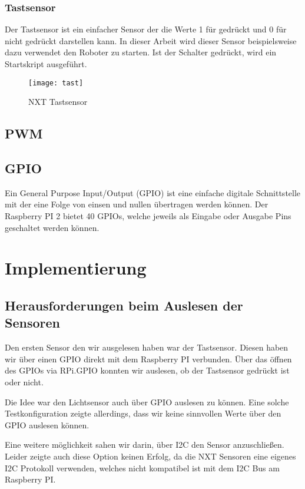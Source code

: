 \subsection{Tastsensor}

Der Tastsensor ist ein einfacher Sensor der die Werte 1 für gedrückt und 0 für nicht gedrückt darstellen kann. In dieser Arbeit wird dieser Sensor beispielsweise dazu verwendet den Roboter zu starten. Ist der Schalter gedrückt, wird ein Startskript ausgeführt.

\begin{figure}[h]
  \centering
  \texttt{[image: tast]}
  \caption{NXT Tastsensor}
  \label{Kap1:tast}
\end{figure}

\section{PWM}

\section{GPIO}
Ein General Purpose Input/Output (GPIO) ist eine einfache digitale Schnittstelle mit der eine Folge von einsen und nullen übertragen werden können.
Der Raspberry PI 2 bietet 40 GPIOs, welche jeweils als Eingabe oder Ausgabe Pins geschaltet werden können.

\chapter{Implementierung}

\section{Herausforderungen beim Auslesen der Sensoren}

Den ersten Sensor den wir ausgelesen haben war der Tastsensor. Diesen haben wir über einen GPIO direkt mit dem Raspberry PI verbunden.
Über das öffnen des GPIOs via RPi.GPIO konnten wir auslesen, ob der Tastsensor gedrückt ist oder nicht. 

Die Idee war den Lichtsensor auch über GPIO auslesen zu können. Eine solche Testkonfiguration zeigte allerdings, dass wir keine sinnvollen Werte über den GPIO auslesen können. 

Eine weitere möglichkeit sahen wir darin, über I2C den Sensor anzuschließen. Leider zeigte auch diese Option keinen Erfolg, da die NXT Sensoren eine eigenes I2C  Protokoll verwenden, welches nicht kompatibel ist mit dem I2C Bus am Raspberry PI. 

